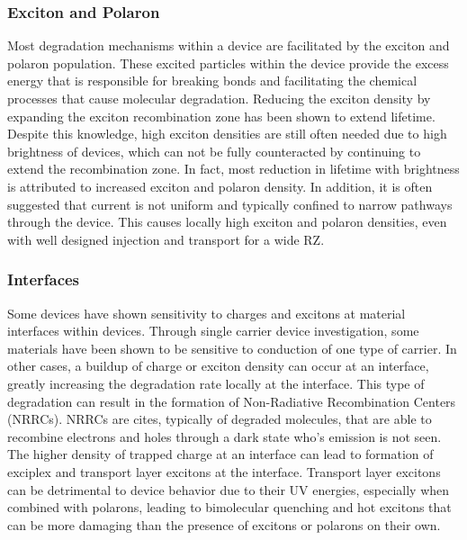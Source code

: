\documentclass[../thesis.tex]{subfiles}
\begin{document}
\subsubsection{Exciton and Polaron}\label{sec:oleds_deg_mech_physics}

Most degradation mechanisms within a device are facilitated by the exciton and polaron population.\supercite{Bangsund2018,Scholz2015,Giebink2008a,Giebink2009a,Zhang2016,So2010}
These excited particles within the device provide the excess energy that is responsible for breaking bonds and facilitating the chemical processes that cause molecular degradation.
Reducing the exciton density by expanding the exciton recombination zone has been shown to extend lifetime.\supercite{Bangsund2018,Zhang2014,Wu2016,Chin2005,Lee2006,Chwang2002,Han2016,Lee2005a,Brown2004,Choong2000,Liu2004}
Despite this knowledge, high exciton densities are still often needed due to high brightness of devices, which can not be fully counteracted by continuing to extend the recombination zone.
In fact, most reduction in lifetime with brightness is attributed to increased exciton and polaron density.\supercite{Scholz2015}
In addition, it is often suggested that current is not uniform and typically confined to narrow pathways through the device.\supercite{Shen2015}
This causes locally high exciton and polaron densities, even with well designed injection and transport for a wide RZ.



\subsubsection{Interfaces}

Some devices have shown sensitivity to charges and excitons at material interfaces within devices.\supercite{Hershey2016,Wang2013}
Through single carrier device investigation, some materials have been shown to be sensitive to conduction of one type of carrier.\supercite{Aziz1999}
In other cases, a buildup of charge or exciton density can occur at an interface, greatly increasing the degradation rate locally at the interface.\supercite{Kondakov2003,Matsumura2003}
This type of degradation can result in the formation of Non-Radiative Recombination Centers (NRRCs).\supercite{Kondakov2007b,Kondakov2008,Kondakov2003,Kondakov2007d}
NRRCs are cites, typically of degraded molecules, that are able to recombine electrons and holes through a dark state who's emission is not seen.
The higher density of trapped charge at an interface can lead to formation of exciplex and transport layer excitons at the interface.  \supercite{Wang2013}
Transport layer excitons can be detrimental to device behavior due to their UV energies, especially when combined with polarons, leading to bimolecular quenching and hot excitons that can be more damaging than the presence of excitons or polarons on their own.
\end{document}
